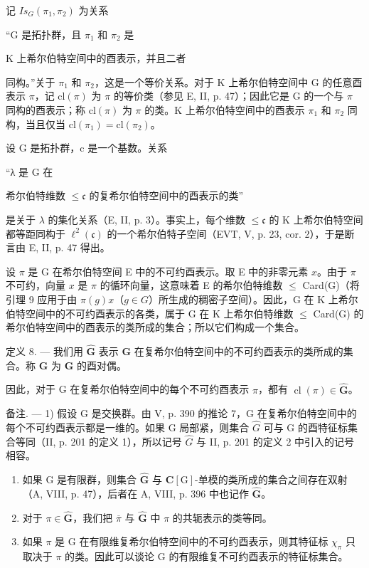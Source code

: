 记 \(Is_{G}(\pi_{1},\pi_{2})\) 为关系

“G 是拓扑群，且 \(\pi_{1}\) 和 \(\pi_{2}\) 是

K 上希尔伯特空间中的酉表示，并且二者

同构。”关于 \(\pi_{1}\) 和 \(\pi_{2}\)，这是一个等价关系。对于 K 上希尔伯特空间中 G 的任意酉表示 \(\pi\)，记 \(\mathrm{cl}(\pi)\) 为 \(\pi\) 的等价类（参见 E, II, p. 47）；因此它是 G 的一个与 \(\pi\) 同构的酉表示；称 \(\mathrm{cl}(\pi)\) 为 \(\pi\) 的类。K 上希尔伯特空间中的酉表示 \(\pi_{1}\) 和 \(\pi_{2}\) 同构，当且仅当 \(\mathrm{cl}(\pi_{1}) = \mathrm{cl}(\pi_{2})\)。

设 G 是拓扑群，c 是一个基数。关系

“λ 是 G 在

希尔伯特维数 \(\leqslant\mathfrak{c}\) 的复希尔伯特空间中的酉表示的类”

是关于 \(\lambda\) 的集化关系（E, II, p. 3）。事实上，每个维数 \(\leqslant \mathfrak{c}\) 的 K 上希尔伯特空间都等距同构于 \(\ell^2 (\mathfrak{c})\) 的一个希尔伯特子空间（EVT, V, p. 23, cor. 2），于是断言由 E, II, p. 47 得出。

设 \(\pi\) 是 G 在希尔伯特空间 E 中的不可约酉表示。取 E 中的非零元素 \(x\)。由于 \(\pi\) 不可约，向量 \(x\) 是 \(\pi\) 的循环向量，这意味着 E 的希尔伯特维数 \(\leqslant\) Card(G)（将引理 9 应用于由 \(\pi(g)x\)（\(g \in G\)）所生成的稠密子空间）。因此，G 在 K 上希尔伯特空间中的不可约酉表示的各类，属于 G 在 K 上希尔伯特维数 \(\leqslant\) Card(G) 的希尔伯特空间中的酉表示的类所成的集合；所以它们构成一个集合。

定义 8. --- 我们用 \(\widehat{\mathbf{G}}\) 表示 \(\mathbf{G}\) 在复希尔伯特空间中的不可约酉表示的类所成的集合。称 \(\widehat{\mathbf{G}}\) 为 \(\mathbf{G}\) 的酉对偶。

因此，对于 G 在复希尔伯特空间中的每个不可约酉表示 \(\pi\)，都有 \(\operatorname{cl}(\pi) \in \widehat{\mathbf{G}}\)。

备注. --- 1) 假设 G 是交换群。由 V, p. 390 的推论 7，G 在复希尔伯特空间中的每个不可约酉表示都是一维的。如果 G 局部紧，则集合 \(\widehat{G}\) 可与 G 的酉特征标集合等同（II, p. 201 的定义 1），所以记号 \(\widehat{G}\) 与 II, p. 201 的定义 2 中引入的记号相容。

\begin{enumerate}
\def\labelenumi{\arabic{enumi})}
\setcounter{enumi}{1}
\item
  如果 G 是有限群，则集合 \(\widehat{\mathbf{G}}\) 与 \(\mathbf{C}[\mathrm{G}]\)-单模的类所成的集合之间存在双射（A, VIII, p. 47），后者在 A, VIII, p. 396 中也记作 \(\widehat{\mathbf{G}}\)。
\item
  对于 \(\pi \in \widehat{\mathbf{G}}\)，我们把 \(\overline{\pi}\) 与 \(\widehat{\mathbf{G}}\) 中 \(\pi\) 的共轭表示的类等同。
\item
  如果 \(\pi\) 是 G 在有限维复希尔伯特空间中的不可约酉表示，则其特征标 \(\chi_{\pi}\) 只取决于 \(\pi\) 的类。因此可以谈论 G 的有限维复不可约酉表示的特征标集合。
\end{enumerate}

